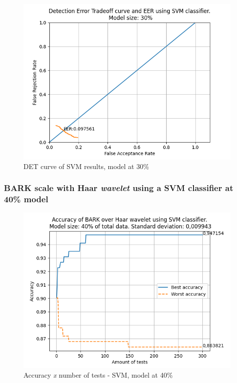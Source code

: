 			\begin{figure}[H]
				\centering
				\includegraphics[scale=.6]{images/results/det/DET_SVM_30}
				\caption{DET curve of SVM results, model at 30\%}
				\label{fig:detsvm30}
			\end{figure}

			
		
		\subsubsection{BARK scale with Haar \textit{wavelet} using a SVM classifier at 40\% model}
			
			\begin{figure}[H]
				\centering
				\includegraphics[scale=.6]{images/results/confusionMatrices/classifier_SVM_40.png}
				\caption{Accuracy \textit{x} number of tests - SVM, model at 40\%}
				\label{fig:classifiersvm40}
			\end{figure}
			
